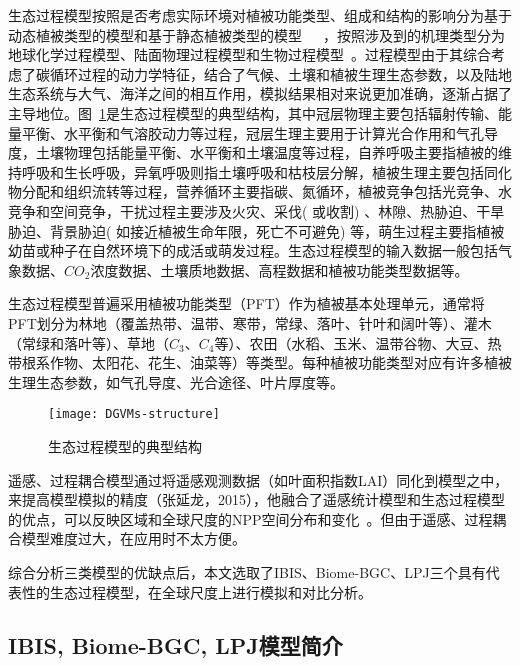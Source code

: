 生态过程模型按照是否考虑实际环境对植被功能类型、组成和结构的影响分为基于动态植被类型的模型和基于静态植被类型的模型~\cite{2008-wangshaogang}~\cite{2009-wangping}~\cite{2006-maoliuxi}，按照涉及到的机理类型分为地球化学过程模型、陆面物理过程模型和生物过程模型~\cite{xieqinyao}。过程模型由于其综合考虑了碳循环过程的动力学特征，结合了气候、土壤和植被生理生态参数，以及陆地生态系统与大气、海洋之间的相互作用，模拟结果相对来说更加准确，逐渐占据了主导地位。图~\ref{fig:DGVMs-structure}是生态过程模型的典型结构，其中冠层物理主要包括辐射传输、能量平衡、水平衡和气溶胶动力等过程，冠层生理主要用于计算光合作用和气孔导度，土壤物理包括能量平衡、水平衡和土壤温度等过程，自养呼吸主要指植被的维持呼吸和生长呼吸，异氧呼吸则指土壤呼吸和枯枝层分解，植被生理主要包括同化物分配和组织流转等过程，营养循环主要指碳、氮循环，植被竞争包括光竞争、水竞争和空间竞争，干扰过程主要涉及火灾、采伐( 或收割) 、林隙、热胁迫、干旱胁迫、背景胁迫( 如接近植被生命年限，死亡不可避免) 等，萌生过程主要指植被幼苗或种子在自然环境下的成活或萌发过程。生态过程模型的输入数据一般包括气象数据、$CO_2$浓度数据、土壤质地数据、高程数据和植被功能类型数据等。

生态过程模型普遍采用植被功能类型（PFT）作为植被基本处理单元，通常将PFT划分为林地（覆盖热带、温带、寒带，常绿、落叶、针叶和阔叶等）、灌木（常绿和落叶等）、草地（$C_3$、$C_4$等）、农田（水稻、玉米、温带谷物、大豆、热带根系作物、太阳花、花生、油菜等）等类型。每种植被功能类型对应有许多植被生理生态参数，如气孔导度、光合途径、叶片厚度等。

\begin{figure}[!htbp]
    \centering
    \texttt{[image: DGVMs-structure]}
    \caption{生态过程模型的典型结构}
    \label{fig:DGVMs-structure}
\end{figure}

遥感、过程耦合模型通过将遥感观测数据（如叶面积指数LAI）同化到模型之中，来提高模型模拟的精度（张延龙，2015），他融合了遥感统计模型和生态过程模型的优点，可以反映区域和全球尺度的NPP空间分布和变化~\cite{zhuwenquan-2005}。但由于遥感、过程耦合模型难度过大，在应用时不太方便。

综合分析三类模型的优缺点后，本文选取了IBIS、Biome-BGC、LPJ三个具有代表性的生态过程模型，在全球尺度上进行模拟和对比分析。

\subsection{IBIS, Biome-BGC, LPJ模型简介}
